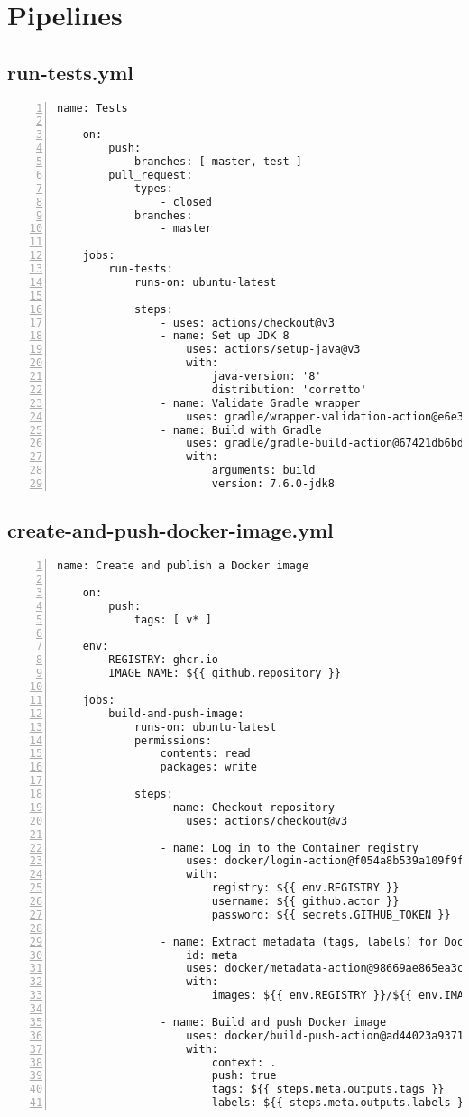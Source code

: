 
\chapter{Pipelines}
\label{app:pipeline}

\section{run-tests.yml}
\begin{Verbatim}[numbers=left,xleftmargin=1cm,firstnumber=1,breaklines=true,breakanywhere=true,tabsize=2]
	name: Tests

	on:
		push:
			branches: [ master, test ]
		pull_request:
			types:
				- closed
			branches:
				- master

	jobs:
		run-tests:
			runs-on: ubuntu-latest

			steps:
				- uses: actions/checkout@v3
				- name: Set up JDK 8
					uses: actions/setup-java@v3
					with:
						java-version: '8'
						distribution: 'corretto'
				- name: Validate Gradle wrapper
					uses: gradle/wrapper-validation-action@e6e38bacfdf1a337459f332974bb2327a31aaf4b
				- name: Build with Gradle
					uses: gradle/gradle-build-action@67421db6bd0bf253fb4bd25b31ebb98943c375e1
					with:
						arguments: build
						version: 7.6.0-jdk8
\end{Verbatim}

\section{create-and-push-docker-image.yml}
\begin{Verbatim}[numbers=left,xleftmargin=1cm,firstnumber=1,breaklines=true,breakanywhere=true,tabsize=2]
	name: Create and publish a Docker image

	on:
		push:
			tags: [ v* ]

	env:
		REGISTRY: ghcr.io
		IMAGE_NAME: ${{ github.repository }}

	jobs:
		build-and-push-image:
			runs-on: ubuntu-latest
			permissions:
				contents: read
				packages: write

			steps:
				- name: Checkout repository
					uses: actions/checkout@v3

				- name: Log in to the Container registry
					uses: docker/login-action@f054a8b539a109f9f41c372932f1ae047eff08c9
					with:
						registry: ${{ env.REGISTRY }}
						username: ${{ github.actor }}
						password: ${{ secrets.GITHUB_TOKEN }}

				- name: Extract metadata (tags, labels) for Docker
					id: meta
					uses: docker/metadata-action@98669ae865ea3cffbcbaa878cf57c20bbf1c6c38
					with:
						images: ${{ env.REGISTRY }}/${{ env.IMAGE_NAME }}

				- name: Build and push Docker image
					uses: docker/build-push-action@ad44023a93711e3deb337508980b4b5e9bcdc5dc
					with:
						context: .
						push: true
						tags: ${{ steps.meta.outputs.tags }}
						labels: ${{ steps.meta.outputs.labels }}
\end{Verbatim}
